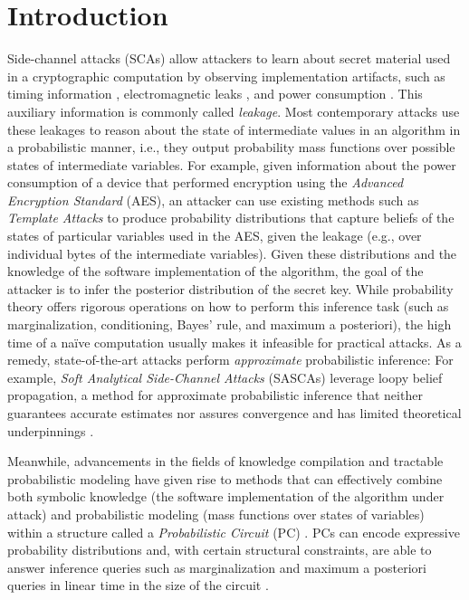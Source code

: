 \chapter{Introduction}
\label{cha:introduction}

Side-channel attacks (SCAs) allow attackers to learn about secret material used in a cryptographic computation by observing implementation artifacts, such as timing information \cite{timing_kocher}, electromagnetic leaks \cite{em_gandolfi}, and power consumption \cite{dpa_kocher}. This auxiliary information is commonly called \textit{leakage}.
Most contemporary attacks use these leakages to reason about the state of intermediate values in an algorithm in a probabilistic manner, i.e., they output probability mass functions over possible states of intermediate variables. For example, given information about the power consumption of a device that performed encryption using the \textit{Advanced Encryption Standard} (AES), an attacker can use existing methods such as \textit{Template Attacks} \cite{template_attacks} to produce probability distributions that capture beliefs of the states of particular variables used in the AES, given the leakage (e.g., over individual bytes of the intermediate variables). Given these distributions and the knowledge of the software implementation of the algorithm, the goal of the attacker is to infer the posterior distribution of the secret key. While probability theory offers rigorous operations on how to perform this inference task (such as marginalization, conditioning, Bayes' rule, and maximum a posteriori), the high time of a na\"ive computation usually makes it infeasible for practical attacks. As a remedy, state-of-the-art attacks perform \textit{approximate} probabilistic inference: For example, \textit{Soft Analytical Side-Channel Attacks} (SASCAs) \cite{sasca} leverage loopy belief propagation, a method for approximate probabilistic inference that neither guarantees accurate estimates nor assures convergence and has limited theoretical underpinnings \cite{bp}.

Meanwhile, advancements in the fields of knowledge compilation and tractable probabilistic modeling have given rise to methods that can effectively combine both symbolic knowledge (the software implementation of the algorithm under attack) and probabilistic modeling (mass functions over states of variables) within a structure called a \textit{Probabilistic Circuit} (PC) \cite{sdd, psdd, dynamic_min_choi}. PCs can encode expressive probability distributions and, with certain structural constraints, are able to answer inference queries such as marginalization and maximum a posteriori queries in linear time in the size of the circuit \cite{psdd}.

